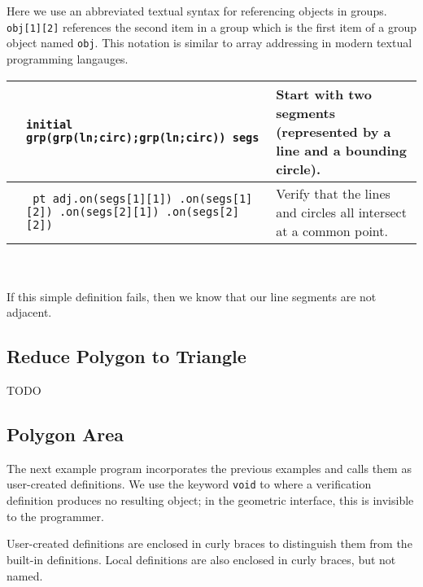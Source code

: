 \documentclass[11pt]{report}
\begin{document}
Here we use an abbreviated textual syntax for referencing objects in groups. {\tt obj[1][2]} references the second item in a group which is the first item of a group object named {\tt obj}. This notation is similar to array addressing in modern textual programming langauges. \\

\noindent \begin{tabularx}{\textwidth}{l X p{4cm}}
\hspace{3.5cm}\vspace{1cm} & {\tt initial grp(grp(ln;circ);\newline grp(ln;circ)) segs } & {\small Start with two segments (represented by a line and a bounding circle). } \\
\hline
\vspace{0.5cm} & 
{\tt
pt adj.on(segs[1][1]) \newline
      .on(segs[1][2]) \newline
      .on(segs[2][1]) \newline
      .on(segs[2][2])
} & {\small Verify that the lines and circles all intersect at a common point.} \\
\end{tabularx}\\\\

If this simple definition fails, then we know that our line segments are not adjacent.

\subsection{Reduce Polygon to Triangle}
\label{subsec:reducepoly}

TODO

\subsection{Polygon Area}
\label{subsec:polyarea}

The next example program incorporates the previous examples and calls them as user-created definitions. We use the keyword {\tt void} to where a verification definition produces no resulting object; in the geometric interface, this is invisible to the programmer.

User-created definitions are enclosed in curly braces to distinguish them from the built-in definitions. Local definitions are also enclosed in curly braces, but not named. \\
\end{document}
